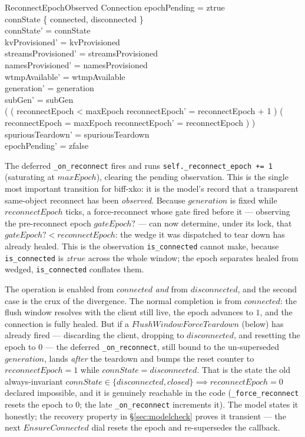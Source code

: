 \documentclass[a4paper,10pt,fleqn]{article}
\begin{document}
\begin{schema}{ReconnectEpochObserved}
  \Delta Connection
  \where
  epochPending = ztrue \\
  connState \in \{ connected, disconnected \} \\
  connState' = connState \\
  kvProvisioned' = kvProvisioned \\
  streamsProvisioned' = streamsProvisioned \\
  namesProvisioned' = namesProvisioned \\
  wtmpAvailable' = wtmpAvailable \\
  generation' = generation \\
  subGen' = subGen \\
  ( ( reconnectEpoch < maxEpoch \land
      reconnectEpoch' = reconnectEpoch + 1 ) \lor
    ( reconnectEpoch = maxEpoch \land
      reconnectEpoch' = reconnectEpoch ) ) \\
  spuriousTeardown' = spuriousTeardown \\
  epochPending' = zfalse
\end{schema}

The deferred \texttt{\_on\_reconnect} fires and runs
\texttt{self.\_reconnect\_epoch += 1} (saturating at $maxEpoch$),
clearing the pending observation.  This is the single most important
transition for biff-xko: it is the model's record that a transparent
same-object reconnect has been \emph{observed}.  Because $generation$ is
fixed while $reconnectEpoch$ ticks, a force-reconnect whose gate fired
before it --- observing the pre-reconnect epoch $gateEpoch?$ --- can now
determine, under its lock, that $gateEpoch? < reconnectEpoch$: the wedge
it was dispatched to tear down has already healed.  This is the
observation \texttt{is\_connected} cannot make, because
\texttt{is\_connected} is $ztrue$ across the whole window; the epoch
separates healed from wedged, \texttt{is\_connected} conflates them.

The operation is enabled from $connected$ \emph{and} from $disconnected$,
and the second case is the crux of the divergence.  The normal
completion is from $connected$: the flush window resolves with the client
still live, the epoch advances to $1$, and the connection is fully
healed.  But if a $FlushWindowForceTeardown$ (below) has already fired
--- discarding the client, dropping to $disconnected$, and resetting the
epoch to $0$ --- the deferred \texttt{\_on\_reconnect}, still bound to the
un-superseded $generation$, lands \emph{after} the teardown and bumps the
reset counter to $reconnectEpoch = 1$ while $connState = disconnected$.
That is the state the old always-invariant $connState \in \{
disconnected, closed \} \implies reconnectEpoch = 0$ declared impossible,
and it is genuinely reachable in the code (\texttt{\_force\_reconnect}
resets the epoch to $0$; the late \texttt{\_on\_reconnect} increments it).
The model states it honestly; the recovery property in
\S\ref{sec:modelcheck} proves it transient --- the next $EnsureConnected$
dial resets the epoch and re-supersedes the callback.
\end{document}
